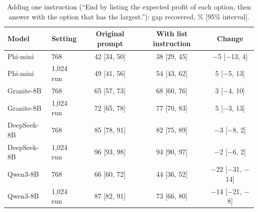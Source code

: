 \begin{table}[t]
\caption{Adding one instruction (``End by listing the expected profit of each option, then answer with the option that has the largest.''): gap recovered, \% [95\% interval].}
\label{tab:prompt}
\footnotesize
\centering

\begin{tabular}{llccc}
\toprule
Model & Setting & Original prompt & With list instruction & Change \\
\midrule
Phi-mini & 768 & 42 [34, 50] & 38 [29, 45] & $-$5 [$-$13, 4] \\
Phi-mini & 1,024 run & 49 [41, 56] & 54 [43, 62] & 5 [$-$5, 13] \\
Granite-8B & 768 & 65 [57, 73] & 68 [60, 76] & 3 [$-$4, 10] \\
Granite-8B & 1,024 run & 72 [65, 78] & 77 [70, 83] & 5 [$-$3, 13] \\
DeepSeek-8B & 768 & 85 [78, 91] & 82 [75, 89] & $-$3 [$-$8, 2] \\
DeepSeek-8B & 1,024 run & 96 [93, 98] & 94 [90, 97] & $-$2 [$-$6, 2] \\
Qwen3-8B & 768 & 66 [60, 72] & 44 [36, 52] & $-$22 [$-$31, $-$14] \\
Qwen3-8B & 1,024 run & 87 [82, 91] & 73 [66, 80] & $-$14 [$-$21, $-$8] \\
\bottomrule
\end{tabular}
\end{table}
